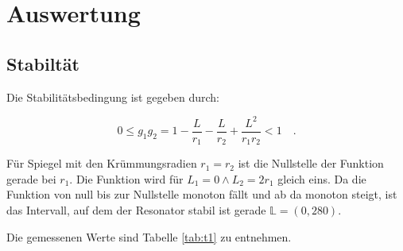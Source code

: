 \section{Auswertung}
\subsection{Stabiltät}
Die Stabilitätsbedingung ist gegeben durch:

\begin{equation}
0\le g_1g_2=1-\frac{L}{r_1}-\frac{L}{r_2}+\frac{L^2}{r_1r_2}<1\quad.
\end{equation}

Für Spiegel mit den Krümmungsradien \(r_1=r_2\) ist die Nullstelle der Funktion gerade bei \(r_1\). Die Funktion wird für \(L_1=0\land L_2=2r_1\) gleich eins. Da die Funktion von null bis zur Nullstelle monoton fällt und ab da monoton steigt, ist das Intervall, auf dem der Resonator stabil ist gerade \(\mathbb{L}=(0,280)\).

\noindent Die gemessenen Werte sind Tabelle \ref{tab:t1} zu entnehmen.


